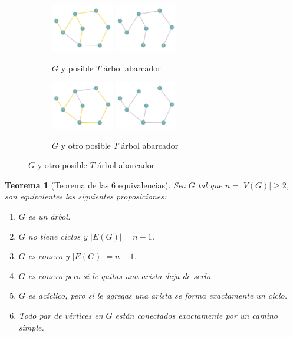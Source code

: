\documentclass[a4paper,1pt]{report}
\newtheorem*{teo}{Teorema}
\begin{document}
\begin{figure}[H]
    \centering
    \begin{subfigure}[b]{0.8\textwidth}
    \centering
    \includegraphics[width=0.30\textwidth]{figures2/arbolA1.png}
    \includegraphics[width=0.30\textwidth]{figures2/T1.png}
    \caption{$G$ y posible $T$ \'arbol abarcador}
    \end{subfigure}
    \begin{subfigure}[b]{0.8\textwidth}
        \centering
    \includegraphics[width=0.30\textwidth]{figures2/arbolA2.png}
    \includegraphics[width=0.30\textwidth]{figures2/T2.png}
    \caption{$G$ y otro posible $T$ \'arbol abarcador}
    \end{subfigure}
\end{figure} 

\begin{teo}[Teorema de las 6 equivalencias]
Sea $G$ tal que $n = |V(G)| \geq 2$, son equivalentes las siguientes proposiciones:

\begin{enumerate}
    \item $G$ es un \'arbol.
    \item $G$ no tiene ciclos y $|E(G)| = n-1$.
    \item $G$ es conexo y $|E(G)| = n-1$.
    \item $G$ es conexo pero si le quitas una arista deja de serlo.
    \item $G$ es ac\'iclico, pero si le agregas una arista se forma exactamente un ciclo.
    \item Todo par de v\'ertices en $G$ est\'an conectados exactamente por un camino simple. 
\end{enumerate}
\end{teo}
\end{document}
